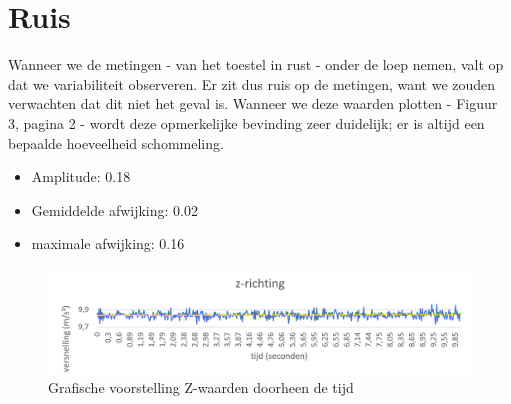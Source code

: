 \documentclass{article}
\begin{document}
\section{Ruis}

Wanneer we de metingen - van het toestel in rust - onder de loep nemen, valt op dat we variabiliteit observeren. Er zit dus ruis op de metingen, want we zouden verwachten dat dit niet het geval is. Wanneer we deze waarden plotten - Figuur 3, pagina 2 - wordt deze opmerkelijke bevinding zeer duidelijk; er is altijd een bepaalde hoeveelheid schommeling.

\begin{itemize}
    \item Amplitude: 0.18
    \item Gemiddelde afwijking: 0.02
    \item maximale afwijking: 0.16
\end{itemize}
\begin{figure}[!h]
    \centering
    \includegraphics[scale=0.65]{figures/andereAfb/GemiddeldeAfw.png}
    \caption{Grafische voorstelling Z-waarden doorheen de tijd}
    \label{wrap-fig:3}
\end{figure}
\end{document}
